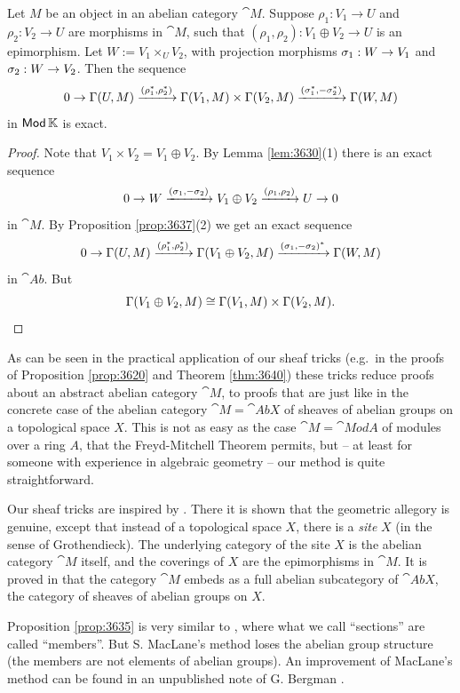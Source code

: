 \begin{prop} \label{prop:3636}
Let $M$ be an object in an abelian category $\cat{M}$. Suppose 
$\rho_1 : V_1 \to U$ and $\rho_2 : V_2 \to U$ are morphisms in $\cat{M}$, 
such that 
$(\rho_1, \rho_2) : V_1 \oplus V_2 \to U$
is an epimorphism. Let $W := V_1 \times_U V_2$, with projection morphisms 
$\sigma_1 : W \to V_1$ and $\sigma_2 : W \to V_2$. 
Then the sequence 
\[ 0 \to \Gamma(U, M) \xrightarrow{(\rho_1^*, \rho_2^*)} \Gamma(V_1, M) \times \Gamma(V_2, M)
\xrightarrow{(\sigma_1^*, - \sigma_2^*)} \Gamma(W, M) \]
in $\operatorname{\mathsf{Mod}} \mathbb{K}$ is exact. 
\end{prop}

\begin{proof}
Note that $V_1 \times V_2 = V_1 \oplus V_2$. 
By Lemma \ref{lem:3630}(1) there is an exact sequence 
\[ 0 \to W \xrightarrow{(\sigma_1, -\sigma_2)} V_1 \oplus V_2 \xrightarrow{(\rho_1, \rho_2)} U 
\to 0 \]
in $\cat{M}$. By Proposition \ref{prop:3637}(2) we get an exact sequence
\[ 0 \to \Gamma(U, M) \xrightarrow{(\rho_1^*, \rho_2^*)} \Gamma(V_1 \oplus V_2, M)
\xrightarrow{(\sigma_1, -\sigma_2)^*} \Gamma(W, M) \]
in $\cat{Ab}$. But 
\[ \Gamma(V_1 \oplus V_2, M) \cong \Gamma(V_1, M) \times \Gamma(V_2, M) . \qedhere \]
\end{proof}

\begin{rem} \label{rem:3630}
As can be seen in the practical application of our sheaf tricks (e.g.\ 
in the proofs of Proposition \ref{prop:3620} and Theorem \ref{thm:3640})
these tricks reduce proofs about an abstract abelian category $\cat{M}$, to 
proofs that are just like in the concrete case of the  abelian category
$\cat{M} = \cat{Ab} X$ of sheaves of abelian groups on a topological 
space $X$. This is not as easy as the case 
$\cat{M} = \cat{Mod} A$ of modules over a ring $A$, that the Freyd-Mitchell 
Theorem permits, but -- at least for someone with experience in algebraic 
geometry -- our method is quite straightforward. 

Our sheaf tricks are inspired by \cite[tag 05PL]{SP}. There it is shown 
that the geometric allegory is genuine, except that instead of a topological 
space $X$, there is a {\em site} $X$ (in the sense of Grothendieck). The 
underlying category of the site $X$ is the abelian category $\cat{M}$ itself, 
and the coverings of $X$ are the epimorphisms in $\cat{M}$. It is proved in 
\cite{SP} that the category $\cat{M}$ embeds as a full abelian subcategory of 
$\cat{Ab} X$, the category of sheaves of abelian groups on $X$. 

Proposition \ref{prop:3635} is very similar to
\cite[Theorem VIII.3]{Mac2}, where what 
we call ``sections'' are called ``members''. But S. MacLane's method loses the 
abelian group structure (the members are not elements of abelian groups). 
An improvement of MacLane's method can be found in an unpublished note of 
G. Bergman \cite{Ber}. 
\end{rem}




